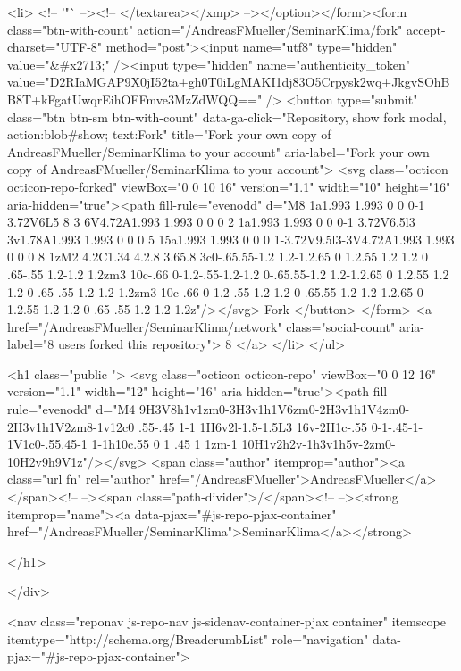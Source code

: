   <li>
          <!-- '"` --><!-- </textarea></xmp> --></option></form><form class="btn-with-count" action="/AndreasFMueller/SeminarKlima/fork" accept-charset="UTF-8" method="post"><input name="utf8" type="hidden" value="&#x2713;" /><input type="hidden" name="authenticity_token" value="D2RIaMGAP9X0jI52ta+gh0T0iLgMAKI1dj83O5Crpysk2wq+JkgvSOhBB8T+kFgatUwqrEihOFFmve3MzZdWQQ==" />
            <button
                type="submit"
                class="btn btn-sm btn-with-count"
                data-ga-click="Repository, show fork modal, action:blob#show; text:Fork"
                title="Fork your own copy of AndreasFMueller/SeminarKlima to your account"
                aria-label="Fork your own copy of AndreasFMueller/SeminarKlima to your account">
              <svg class="octicon octicon-repo-forked" viewBox="0 0 10 16" version="1.1" width="10" height="16" aria-hidden="true"><path fill-rule="evenodd" d="M8 1a1.993 1.993 0 0 0-1 3.72V6L5 8 3 6V4.72A1.993 1.993 0 0 0 2 1a1.993 1.993 0 0 0-1 3.72V6.5l3 3v1.78A1.993 1.993 0 0 0 5 15a1.993 1.993 0 0 0 1-3.72V9.5l3-3V4.72A1.993 1.993 0 0 0 8 1zM2 4.2C1.34 4.2.8 3.65.8 3c0-.65.55-1.2 1.2-1.2.65 0 1.2.55 1.2 1.2 0 .65-.55 1.2-1.2 1.2zm3 10c-.66 0-1.2-.55-1.2-1.2 0-.65.55-1.2 1.2-1.2.65 0 1.2.55 1.2 1.2 0 .65-.55 1.2-1.2 1.2zm3-10c-.66 0-1.2-.55-1.2-1.2 0-.65.55-1.2 1.2-1.2.65 0 1.2.55 1.2 1.2 0 .65-.55 1.2-1.2 1.2z"/></svg>
              Fork
            </button>
</form>
    <a href="/AndreasFMueller/SeminarKlima/network" class="social-count"
       aria-label="8 users forked this repository">
      8
    </a>
  </li>
</ul>

      <h1 class="public ">
  <svg class="octicon octicon-repo" viewBox="0 0 12 16" version="1.1" width="12" height="16" aria-hidden="true"><path fill-rule="evenodd" d="M4 9H3V8h1v1zm0-3H3v1h1V6zm0-2H3v1h1V4zm0-2H3v1h1V2zm8-1v12c0 .55-.45 1-1 1H6v2l-1.5-1.5L3 16v-2H1c-.55 0-1-.45-1-1V1c0-.55.45-1 1-1h10c.55 0 1 .45 1 1zm-1 10H1v2h2v-1h3v1h5v-2zm0-10H2v9h9V1z"/></svg>
  <span class="author" itemprop="author"><a class="url fn" rel="author" href="/AndreasFMueller">AndreasFMueller</a></span><!--
--><span class="path-divider">/</span><!--
--><strong itemprop="name"><a data-pjax="#js-repo-pjax-container" href="/AndreasFMueller/SeminarKlima">SeminarKlima</a></strong>

</h1>

    </div>
    
<nav class="reponav js-repo-nav js-sidenav-container-pjax container"
     itemscope
     itemtype="http://schema.org/BreadcrumbList"
     role="navigation"
     data-pjax="#js-repo-pjax-container">

